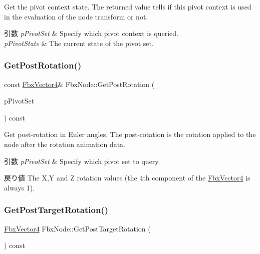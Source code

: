 Get the pivot context state. The returned value tells if this pivot context is used in the evaluation of the node transform or not. 
\begin{DoxyParams}{引数}
{\em p\+Pivot\+Set} & Specify which pivot context is queried. \\
\hline
{\em p\+Pivot\+State} & The current state of the pivot set. \\
\hline
\end{DoxyParams}
\mbox{\label{class_fbx_node_a7a60a83de24636c96067cff6a79903f5}} 
\subsubsection{\texorpdfstring{Get\+Post\+Rotation()}{GetPostRotation()}}
{\footnotesize\ttfamily const \hyperlink{class_fbx_vector4}{Fbx\+Vector4}\& Fbx\+Node\+::\+Get\+Post\+Rotation (\begin{DoxyParamCaption}\item[{\hyperlink{class_fbx_node_ae62b7311ac4727654cdf1ebd5cbf7343}{E\+Pivot\+Set}}]{p\+Pivot\+Set }\end{DoxyParamCaption}) const}

Get post-\/rotation in Euler angles. The post-\/rotation is the rotation applied to the node after the rotation animation data. 
\begin{DoxyParams}{引数}
{\em p\+Pivot\+Set} & Specify which pivot set to query. \\
\hline
\end{DoxyParams}
\begin{DoxyReturn}{戻り値}
The X,Y and Z rotation values (the 4th component of the \hyperlink{class_fbx_vector4}{Fbx\+Vector4} is always 1). 
\end{DoxyReturn}
\mbox{\label{class_fbx_node_ab484186dcdd304a6649b1d4e3fbfc633}} 
\subsubsection{\texorpdfstring{Get\+Post\+Target\+Rotation()}{GetPostTargetRotation()}}
{\footnotesize\ttfamily \hyperlink{class_fbx_vector4}{Fbx\+Vector4} Fbx\+Node\+::\+Get\+Post\+Target\+Rotation (\begin{DoxyParamCaption}{ }\end{DoxyParamCaption}) const}

